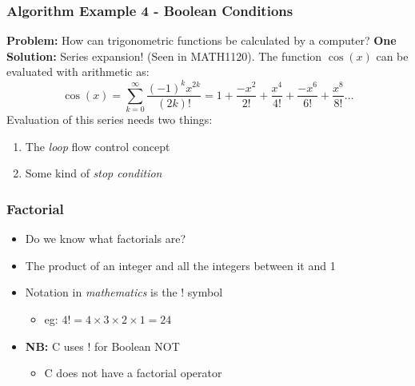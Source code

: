 \documentclass[14pt]{beamer}
\begin{document}
\begin{frame}
\frametitle{Algorithm Example 4 - Boolean Conditions}
{\small
\textbf{Problem:} How can trigonometric functions be calculated by a computer?
\linebreak \linebreak
\textbf{One Solution:} Series expansion! (Seen in MATH1120).
\linebreak \linebreak
The function $\cos (x)$ can be evaluated with arithmetic as:
\begin{equation}
\cos (x) = \sum_{k=0}^{\infty} \frac{(-1)^k x^{2k}}{(2k)!} = 1 + \frac{-x^{2}}{2!} + \frac{x^{4}}{4!} + \frac{-x^6}{6!} + \frac{x^8}{8!} ...
\end{equation}
Evaluation of this series needs two things:
\begin{enumerate}
\item The \textit{loop} flow control concept
\item Some kind of \textit{stop condition}
\end{enumerate}
}
\end{frame}

\begin{frame}[fragile]
\frametitle{Factorial}
\begin{itemize}
\item Do we know what factorials are?
\item The product of an integer and all the integers between it and 1
\item Notation in \textit{mathematics} is the ! symbol
	\begin{itemize}
		\item eg: $4! = 4\times 3\times 2\times 1 = 24$
	\end{itemize}
\item \textbf{NB:} C uses ! for Boolean NOT
	\begin{itemize}
		\item C does not have a factorial operator
	\end{itemize}
\end{itemize}
\end{frame}
\end{document}

